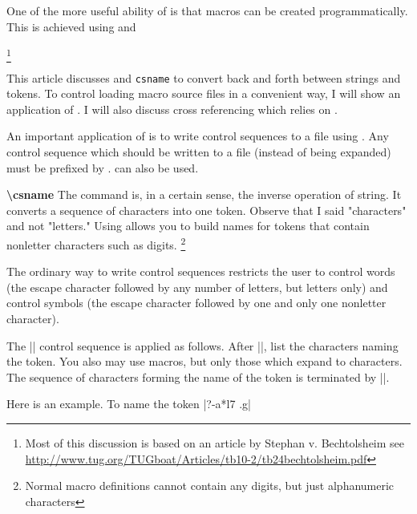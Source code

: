 \begin{multicols}{2}
One of the more useful ability of \tex is that macros can be created programmatically. This is achieved using  and 

\footnote{Most of this discussion is based on an article by Stephan v. Bechtolsheim see \url{http://www.tug.org/TUGboat/Articles/tb10-2/tb24bechtolsheim.pdf}}

This article discusses  and \texttt{csname} to
convert back and forth between strings and tokens.
To control loading macro source files in a convenient
way, I will show an application of . I
will also discuss cross referencing which relies on
.


An important application of  is to
write control sequences to a file using .
Any control sequence which should be written
to a file (instead of being expanded) must be
prefixed by .  can also be
used.


\textbf{\textbackslash csname} The  command
is, in a certain sense, the inverse operation of
string. It converts a sequence of characters into
one token. Observe that I said "characters" and
not "letters." Using \texttt{\string\csname} allows you to build
names for tokens that contain { nonletter characters}
such as digits. \footnote{Normal macro definitions cannot contain any digits, but just alphanumeric characters}

The ordinary way to write control
sequences restricts the user to control words (the
escape character followed by any number of letters,
but letters only) and control symbols (the escape
character followed by one and only one nonletter
character).
\end{multicols}

\begin{teXXX}
\newcommand{\defcsname}{\hlred{\texttt{\string\csname}}}
\newcommand{\defendcsname}{\hlred{\texttt{\string\endcsname\thinspace}}}
\end{teXXX}

\begin{multicols}{2}
The || control sequence is applied as
follows. After ||, list the characters naming
the token. You also may use macros, but only
those which expand to characters. The sequence
of characters forming the name of the token is
terminated by ||.

Here is an example. To name the token |?-a*l7 .g|
\end{multicols}


